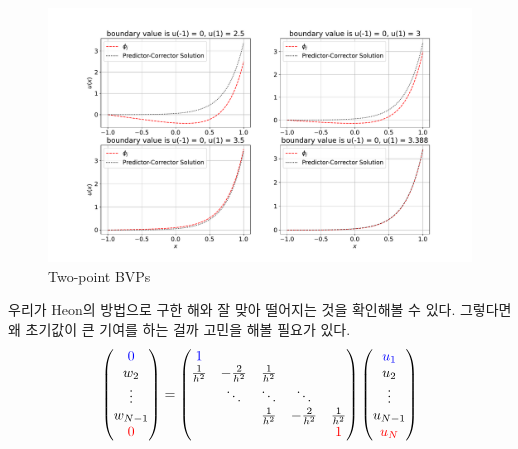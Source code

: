 \documentclass[11pt]{article}
\begin{document}
\begin{figure}[!ht]
  \centering
  \includegraphics[width=1\textwidth]{Two-point_BPS2.pdf}
  \caption{Two-point BVPs}
\end{figure}
우리가 Heon의 방법으로 구한 해와 잘 맞아 떨어지는 것을 확인해볼 수 있다. 그렇다면 왜 초기값이 큰 기여를 하는 걸까 고민을 해볼 필요가 있다. 
\begin{equation}
\begin{split}
\left(
\begin{matrix}
\color{blue}{0} \\
w_{  2} \\
\vdots  \\
w_{N-1} \\
\color{red}{0} \\
\end{matrix}
\right)
=
\left(
\begin{matrix}
\color{blue}{
 1}           &                &               &                &               \\
\frac{1}{h^2} & -\frac{2}{h^2} & \frac{1}{h^2} &                &               \\
              &     \ddots     &    \ddots     &     \ddots     &               \\
              &                & \frac{1}{h^2} & -\frac{2}{h^2} & \frac{1}{h^2} \\
              &                &               &                & \color{red}{1} \\
\end{matrix}
\right)
\left(
\begin{matrix}
\color{blue}{u_{1}} \\
u_{  2} \\
\vdots  \\
u_{N-1} \\
\color{red}{u_{N}} \\
\end{matrix}
\right)
\end{split}
\end{equation}
\end{document}

